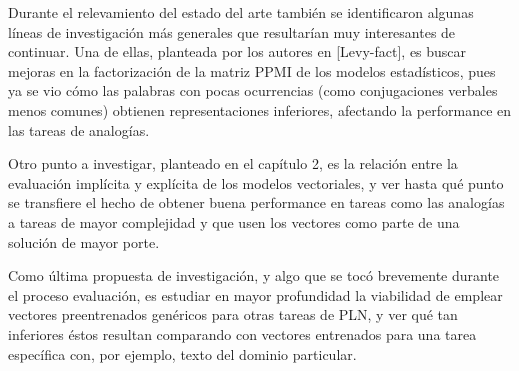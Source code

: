 Durante el relevamiento del estado del arte también se identificaron algunas líneas de investigación
más generales que resultarían muy interesantes de continuar. Una de ellas, planteada por los autores
en [Levy-fact], es buscar mejoras en la factorización de la matriz PPMI de los modelos estadísticos,
pues ya se vio cómo las palabras con pocas ocurrencias (como conjugaciones verbales menos comunes)
obtienen representaciones inferiores, afectando la performance en las tareas de analogías.

Otro punto a investigar, planteado en el capítulo 2, es la relación entre la evaluación implícita y
explícita de los modelos vectoriales, y ver hasta qué punto se transfiere el hecho de obtener buena
performance en tareas como las analogías a tareas de mayor complejidad y que usen los vectores como
parte de una solución de mayor porte.

Como última propuesta de investigación, y algo que se tocó brevemente durante el proceso evaluación,
es estudiar en mayor profundidad la viabilidad de emplear vectores preentrenados genéricos para
otras tareas de PLN, y ver qué tan inferiores éstos resultan comparando con vectores entrenados para
una tarea específica con, por ejemplo, texto del dominio particular.